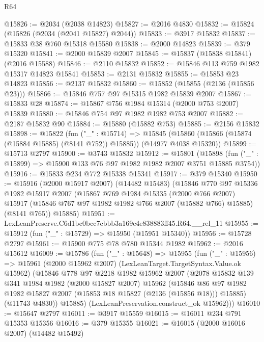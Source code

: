 \begin{lexlean}{R64}
\begin{coremodule}
@15826 := @2034 (@2038 @14823)
@15827 := @2016 @4830
@15832 := @15824 (@15826 (@2034 (@2041 @15827) @2044))
@15833 := @3917 @15832
@15837 := @15833 @38 @760 @15318 @15580
@15838 := @2000 @14823
@15839 := @379 @15320
@15841 := @2000 @15839 @2007
@15845 := @15837 (@15838 @15841) (@2016 @15588)
@15846 := @2110 @15832
@15852 := @15846 @113 @759 @1982 @15317 @14823 @15841
@15853 := @2131 @15832
@15855 := @15853 @23 @14823
@15856 := @2137 @15832
@15860 := @15852 (@15855 (@2136 (@15856 @23)))
@15866 := @15846 @757 @97 @15315 @1982 @15839 @2007
@15867 := @15833 @28
@15874 := @15867 @756 @1984 @15314 (@2000 @753 @2007) @15839
@15880 := @15846 @754 @97 @1982 @1982 @753 @2007
@15882 := @2187 @15832 @90
@15884 := @15880 (@15882 @753)
@15885 := @2156 @15832
@15898 := @15822
    (fun ("_" : @15714) =>
    @15845 (@15860 (@15866 (@15874 (@15884 @15885) (@8141 @752)) @15885)) (@14977 @4038 @15320))
@15899 := @15713 @2797
@15900 := @3743 @15832
@15912 := @15801
    (@15898 (fun ("_" : @15899) => @15900 @133 @76 @97 @1982 @1982 @2007 @3751 @15885 @3754))
@15916 := @15833 @234 @772 @15338 @15341
@15917 := @379 @15340
@15950 := @15916
    (@2000 @15917 @2007)
    (@14482 @15483)
    (@15846
      @770
      @97
      @15336
      @1982
      @15917
      @2007
      (@15867
        @769
        @1984
        @15335
        (@2000 @766 @2007)
        @15917
        (@15846 @767 @97 @1982 @1982 @766 @2007 (@15882 @766) @15885)
        (@8141 @765))
      @15885)
@15951 := LexLeanPreserve.C6d1bc0bcc7cbbb3a169c4e838883ff45.R64.__rel_11
@15955 := @15912 (fun ("_" : @15729) => @15950 (@15951 @15340))
@15956 := @15728 @2797
@15961 := @15900 @775 @78 @780 @15344 @1982
@15962 := @2016 @15612
@16009 := @15786
    (fun ("_" : @15648) =>
    @15955
      (fun ("_" : @15956) =>
      @15961
        (@2000 @15962 @2007)
        (LexLeanTarget.TargetSyntax.Value.ok @15962)
        (@15846
          @778
          @97
          @2218
          @1982
          @15962
          @2007
          (@2078
            @15832
            @139
            @341
            @1984
            @1982
            (@2000 @15827 @2007)
            @15962
            (@15846
              @86
              @97
              @1982
              @1982
              @15827
              @2007
              (@15853 @18 @15827 (@2136 (@15856 @18)))
              @15885)
            (@11743 @4830))
          @15885)
        (LexLeanPreservation.construct_ok @15962)))
@16010 := @15647 @2797
@16011 := @3917 @15559
@16015 := @16011 @234 @791 @15353 @15356
@16016 := @379 @15355
@16021 := @16015 (@2000 @16016 @2007) (@14482 @15492)

\end{coremodule}
\end{lexlean}
